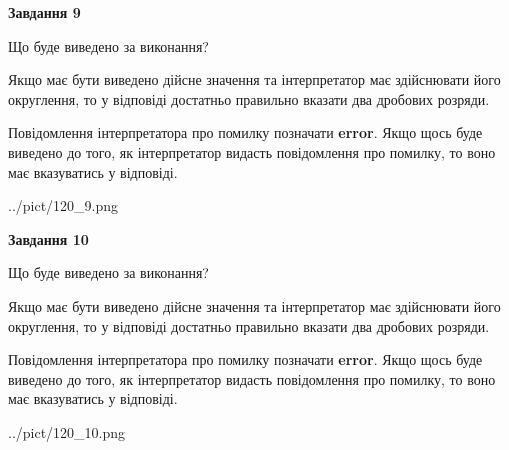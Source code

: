 \documentclass[12pt, ukrainian]{article}
\begin{document}
{\begin {Large}
{\begin {center}\textbf{Завдання 9}\end {center}}\par
Що буде виведено за виконання? \par

Якщо має бути виведено дійсне значення та інтерпретатор має здійснювати його округлення, 
то у відповіді достатньо правильно вказати два дробових розряди.

Повідомлення інтерпретатора про помилку позначати \textbf{error}.
Якщо щось буде виведено до того, як інтерпретатор видасть повідомлення про помилку, 
то воно має вказуватись у відповіді. \par

\begin{center}
	{../pict/120_9.png}
\end{center}
\newpage

{\begin {center}\textbf{Завдання 10}\end {center}}\par
Що буде виведено за виконання? \par

Якщо має бути виведено дійсне значення та інтерпретатор має здійснювати його округлення, 
то у відповіді достатньо правильно вказати два дробових розряди.

Повідомлення інтерпретатора про помилку позначати \textbf{error}.
Якщо щось буде виведено до того, як інтерпретатор видасть повідомлення про помилку, 
то воно має вказуватись у відповіді. \par

\begin{center}
	{../pict/120_10.png}
\end{center}
\newpage

\end {Large}}
\end{document}
